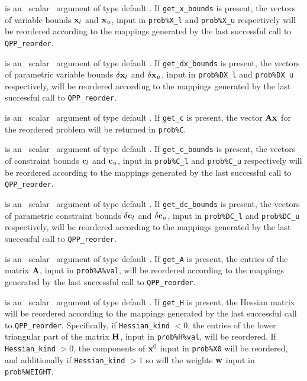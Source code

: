 \documentclass{galahad}
\newcommand{\packagename}{QPP}
\begin{document}
\begin{description}
is an \optional\ scalar \intentin\ argument of type default \logical.
If {\tt get\_x\_bounds} is present,
the vectors of variable bounds ${\mathbf{x}}_l$ and
${\mathbf{x}}_u$, input in {\tt prob\%X\_l} and {\tt prob\%X\_u} respectively
will be reordered according to the
mappings generated by the last successful call to {\tt \packagename\_reorder}.

is an \optional\ scalar \intentin\ argument of type default \logical.
If {\tt get\_dx\_bounds} is present,
the vectors of parametric variable bounds $\delta {\mathbf{x}}_l$ and
$\delta {\mathbf{x}}_u$, input in {\tt prob\%DX\_l} and {\tt prob\%DX\_u} respectively,
will be reordered according to the
mappings generated by the last successful call to {\tt \packagename\_reorder}.

is an \optional\ scalar \intentin\ argument of type default \logical.
If {\tt get\_c} is present, the vector ${\mathbf{A}} {\mathbf{x}}$ for the reordered problem
will be returned in {\tt prob\%C}.

is an \optional\ scalar \intentin\ argument of type default \logical.
If {\tt get\_c\_bounds} is present,
the vectors of constraint bounds ${\mathbf{c}}_l$ and
${\mathbf{c}}_u$, input in {\tt prob\%C\_l} and {\tt prob\%C\_u} respectively
will be reordered according to the
mappings generated by the last successful call to {\tt \packagename\_reorder}.

is an \optional\ scalar \intentin\ argument of type default \logical.
If {\tt get\_dc\_bounds} is present,
the vectors of parametric constraint bounds $\delta {\mathbf{c}}_l$ and
$\delta {\mathbf{c}}_u$, input in {\tt prob\%DC\_l} and {\tt prob\%DC\_u} respectively,
will be reordered according to the
mappings generated by the last successful call to {\tt \packagename\_reorder}.

is an \optional\ scalar \intentin\ argument of type default \logical.
If {\tt get\_A} is present, the entries of the
matrix ${\mathbf{A}}$, input in {\tt prob\%A\%val}, will be reordered according to the
mappings generated by the last successful call to {\tt \packagename\_reorder}.

is an \optional\ scalar \intentin\ argument of type default \logical.
If {\tt get\_H} is present, the Hessian matrix will be reordered according to the
mappings generated by the last successful call to {\tt \packagename\_reorder}.
Specifically, if {\tt Hessian\_kind} $< 0$, the entries of the
lower triangular part of the matrix ${\mathbf{H}}$, input in {\tt prob\%H\%val},
will be reordered. If {\tt Hessian\_kind} $> 0$, the
components of ${\mathbf{x}}^0$ input in {\tt prob\%X0} will be reordered,
and additionally if {\tt Hessian\_kind} $> 1$ so will the weights
${\mathbf{w}}$ input in {\tt prob\%WEIGHT}.

\end{description}
\end{document}
